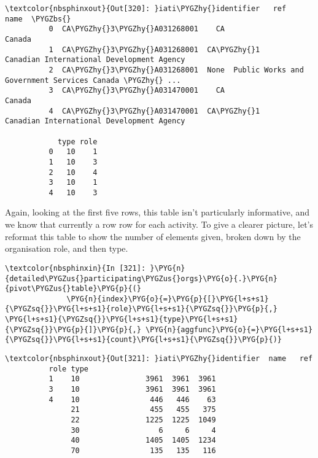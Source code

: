 \documentclass[letterpaper,10pt,english]{sphinxmanual}
\begin{document}
\begin{Verbatim}[commandchars=\\\{\}]
\textcolor{nbsphinxout}{Out[320]: }iati\PYGZhy{}identifier   ref                                               name  \PYGZbs{}
          0  CA\PYGZhy{}3\PYGZhy{}A031268001    CA                                             Canada
          1  CA\PYGZhy{}3\PYGZhy{}A031268001  CA\PYGZhy{}1          Canadian International Development Agency
          2  CA\PYGZhy{}3\PYGZhy{}A031268001  None  Public Works and Government Services Canada \PYGZhy{} ...
          3  CA\PYGZhy{}3\PYGZhy{}A031470001    CA                                             Canada
          4  CA\PYGZhy{}3\PYGZhy{}A031470001  CA\PYGZhy{}1          Canadian International Development Agency
          
            type role
          0   10    1
          1   10    3
          2   10    4
          3   10    1
          4   10    3
\end{Verbatim}

Again, looking at the first five rows, this table isn't particularly
informative, and we know that currently a row row for each activity. To
give a clearer picture, let's reformat this table to show the number of
 elements given, broken down by the organisation role,
and then type.

\begin{Verbatim}[commandchars=\\\{\}]
\textcolor{nbsphinxin}{In [321]: }\PYG{n}{detailed\PYGZus{}participating\PYGZus{}orgs}\PYG{o}{.}\PYG{n}{pivot\PYGZus{}table}\PYG{p}{(}
              \PYG{n}{index}\PYG{o}{=}\PYG{p}{[}\PYG{l+s+s1}{\PYGZsq{}}\PYG{l+s+s1}{role}\PYG{l+s+s1}{\PYGZsq{}}\PYG{p}{,} \PYG{l+s+s1}{\PYGZsq{}}\PYG{l+s+s1}{type}\PYG{l+s+s1}{\PYGZsq{}}\PYG{p}{]}\PYG{p}{,} \PYG{n}{aggfunc}\PYG{o}{=}\PYG{l+s+s1}{\PYGZsq{}}\PYG{l+s+s1}{count}\PYG{l+s+s1}{\PYGZsq{}}\PYG{p}{)}
\end{Verbatim}

\begin{Verbatim}[commandchars=\\\{\}]
\textcolor{nbsphinxout}{Out[321]: }iati\PYGZhy{}identifier  name   ref
          role type
          1    10               3961  3961  3961
          3    10               3961  3961  3961
          4    10                446   446    63
               21                455   455   375
               22               1225  1225  1049
               30                  6     6     4
               40               1405  1405  1234
               70                135   135   116
\end{Verbatim}
\end{document}
